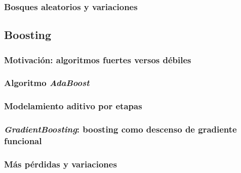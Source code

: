 \subsubsection{Bosques aleatorios y variaciones}


\subsection{Boosting}
\label{sec:boosting}

\subsubsection{Motivación: algoritmos fuertes versos débiles}

\subsubsection{Algoritmo \textit{AdaBoost}}

\subsubsection{Modelamiento aditivo por etapas}

\subsubsection{\textit{GradientBoosting}: boosting como descenso de gradiente funcional}

\subsubsection{Más pérdidas y variaciones}
